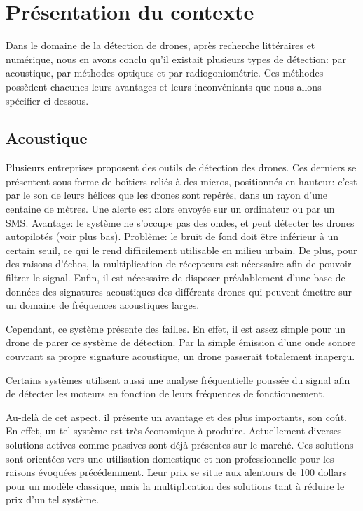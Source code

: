 

\chapter{Présentation du contexte}

Dans le domaine de la détection de drones, après recherche littéraires et numérique, nous en avons conclu qu'il existait plusieurs types de détection: par acoustique, par méthodes optiques et par radiogoniométrie.
Ces méthodes possèdent chacunes leurs avantages et leurs inconvéniants que nous allons spécifier ci-dessous.


\section{Acoustique}

Plusieurs entreprises proposent des outils de détection des drones. Ces derniers se présentent sous forme de boîtiers reliés à des micros, positionnés en hauteur: c'est par le son de leurs hélices que les drones sont repérés, dans un rayon d'une centaine de mètres. Une alerte est alors envoyée sur un ordinateur ou par un SMS. Avantage: le système ne s'occupe pas des ondes, et peut détecter les drones autopilotés (voir plus bas). Problème: le bruit de fond doit être inférieur à un certain seuil, ce qui le rend difficilement utilisable en milieu urbain. De plus, pour des raisons d'échos, la multiplication de récepteurs est nécessaire afin de pouvoir filtrer le signal. Enfin, il est nécessaire de disposer préalablement d'une base de données des signatures acoustiques des différents drones qui peuvent émettre sur un domaine de fréquences acoustiques larges.

Cependant, ce système présente des failles. En effet, il est assez simple pour un drone de parer ce système de détection. Par la simple émission d'une onde sonore couvrant sa propre signature acoustique, un drone passerait totalement inaperçu.

Certains systèmes utilisent aussi une analyse fréquentielle poussée du signal afin de détecter les moteurs en fonction de leurs fréquences de fonctionnement.

Au-delà de cet aspect, il présente un avantage et des plus importants, son coût. En effet, un tel système est très économique à produire. Actuellement diverses solutions actives comme passives sont déjà présentes sur le marché. Ces solutions sont orientées vers une utilisation domestique et non professionnelle pour les raisons évoquées précédemment. Leur prix se situe aux alentours de 100 dollars pour un modèle classique, mais la multiplication des solutions tant à réduire le prix d'un tel système. 

